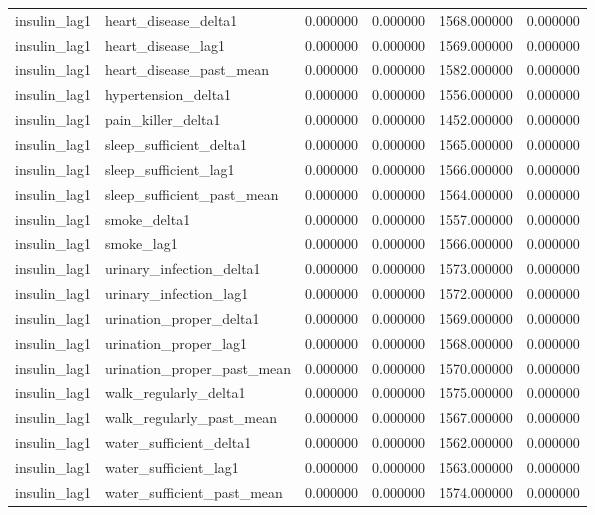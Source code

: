 \begin{longtable}{llrrrr}
insulin\_lag1 & heart\_disease\_delta1 & 0.000000 & 0.000000 & 1568.000000 & 0.000000 \\
insulin\_lag1 & heart\_disease\_lag1 & 0.000000 & 0.000000 & 1569.000000 & 0.000000 \\
insulin\_lag1 & heart\_disease\_past\_mean & 0.000000 & 0.000000 & 1582.000000 & 0.000000 \\
insulin\_lag1 & hypertension\_delta1 & 0.000000 & 0.000000 & 1556.000000 & 0.000000 \\
insulin\_lag1 & pain\_killer\_delta1 & 0.000000 & 0.000000 & 1452.000000 & 0.000000 \\
insulin\_lag1 & sleep\_sufficient\_delta1 & 0.000000 & 0.000000 & 1565.000000 & 0.000000 \\
insulin\_lag1 & sleep\_sufficient\_lag1 & 0.000000 & 0.000000 & 1566.000000 & 0.000000 \\
insulin\_lag1 & sleep\_sufficient\_past\_mean & 0.000000 & 0.000000 & 1564.000000 & 0.000000 \\
insulin\_lag1 & smoke\_delta1 & 0.000000 & 0.000000 & 1557.000000 & 0.000000 \\
insulin\_lag1 & smoke\_lag1 & 0.000000 & 0.000000 & 1566.000000 & 0.000000 \\
insulin\_lag1 & urinary\_infection\_delta1 & 0.000000 & 0.000000 & 1573.000000 & 0.000000 \\
insulin\_lag1 & urinary\_infection\_lag1 & 0.000000 & 0.000000 & 1572.000000 & 0.000000 \\
insulin\_lag1 & urination\_proper\_delta1 & 0.000000 & 0.000000 & 1569.000000 & 0.000000 \\
insulin\_lag1 & urination\_proper\_lag1 & 0.000000 & 0.000000 & 1568.000000 & 0.000000 \\
insulin\_lag1 & urination\_proper\_past\_mean & 0.000000 & 0.000000 & 1570.000000 & 0.000000 \\
insulin\_lag1 & walk\_regularly\_delta1 & 0.000000 & 0.000000 & 1575.000000 & 0.000000 \\
insulin\_lag1 & walk\_regularly\_past\_mean & 0.000000 & 0.000000 & 1567.000000 & 0.000000 \\
insulin\_lag1 & water\_sufficient\_delta1 & 0.000000 & 0.000000 & 1562.000000 & 0.000000 \\
insulin\_lag1 & water\_sufficient\_lag1 & 0.000000 & 0.000000 & 1563.000000 & 0.000000 \\
insulin\_lag1 & water\_sufficient\_past\_mean & 0.000000 & 0.000000 & 1574.000000 & 0.000000 \\

\end{longtable}
